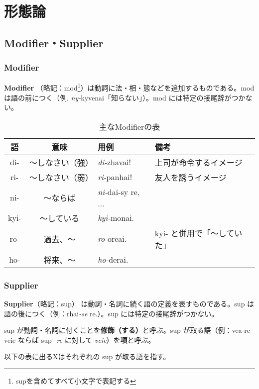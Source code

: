 \section{形態論}

\subsection{Modifier・Supplier}

\subsubsection{Modifier}
\textbf{Modifier} （略記：mod\footnote{supを含めてすべて小文字で表記する}）は動詞に法・相・態などを追加するものである。mod は語の前につく（例. \emph{ny-}kyvenai「知らない」）。mod には特定の接尾辞がつかない。

\begin{table}[h]
    \centering
    \caption{主なModifierの表}
    \begin{tabular}{ccll}
        \hline
        語 & 意味 & 用例 & 備考 \\
        \hline \hline
        di-  & ～しなさい（強） & \emph{di-}zhavai! & 上司が命令するイメージ \\
        ri-  & ～しなさい（弱） & \emph{ri-}panhai! & 友人を誘うイメージ\\
        ni-  & ～ならば   & \emph{ni-}dai-sy re, ...& \\
        kyi- & ～している & \emph{kyi-}monai. & \\
        ro-  & 過去、～   & \emph{ro-}oreai. & kyi- と併用で「～していた」\\
        ho-  & 将来、～   & \emph{ho-}derai. & \\
        \hline
    \end{tabular}
\end{table}

\subsubsection{Supplier}

\textbf{Supplier}（略記：sup） は動詞・名詞に続く語の定義を表すものである。sup は語の後につく（例：rhai\emph{-se} re.）。sup には特定の接尾辞がつかない。

sup が動詞・名詞に付くことを\textbf{修飾（する）}と呼ぶ。sup が取る語（例：vea-re veie ならば sup \emph{-re} に対して \emph{veie}）を\textbf{項}と呼ぶ。

以下の表に出るXはそれぞれの sup が取る語を指す。


